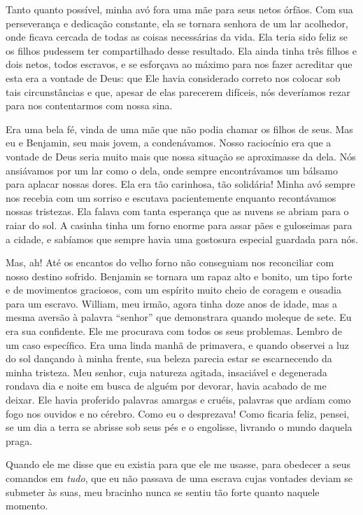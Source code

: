 Tanto quanto possível, minha avó fora
uma mãe para seus netos órfãos. Com sua perseverança e dedicação
constante, ela se tornara senhora de um lar acolhedor, onde ficava
cercada de todas as coisas necessárias da vida. Ela teria sido feliz se
os filhos pudessem ter compartilhado desse resultado. Ela ainda tinha
três filhos e dois netos, todos escravos, e se esforçava ao máximo para
nos fazer acreditar que esta era a vontade de Deus: que Ele havia
considerado correto nos colocar sob tais circunstâncias e que, apesar de
elas parecerem difíceis, nós deveríamos rezar para nos contentarmos com
nossa sina.

Era uma bela fé, vinda de uma mãe que
não podia chamar os filhos de seus. Mas eu e Benjamin, seu mais jovem, a
condenávamos. Nosso raciocínio era que a vontade de Deus seria muito
mais que nossa situação se aproximasse da dela. Nós ansiávamos por um
lar como o dela, onde sempre encontrávamos um bálsamo para aplacar
nossas dores. Ela era tão carinhosa, tão solidária! Minha avó sempre nos
recebia com um sorriso e escutava pacientemente enquanto recontávamos
nossas tristezas. Ela falava com tanta esperança que as nuvens se abriam
para o raiar do sol. A casinha tinha um forno enorme para assar pães e
guloseimas para a cidade, e sabíamos que sempre havia uma gostosura
especial guardada para nós.

Mas, ah! Até os encantos do velho forno
não conseguiam nos reconciliar com nosso destino sofrido. Benjamin se
tornara um rapaz alto e bonito, um tipo forte e de movimentos graciosos,
com um espírito muito cheio de coragem e ousadia para um escravo.
William, meu irmão, agora tinha doze anos de idade, mas a mesma aversão
à palavra ``senhor'' que demonstrara quando moleque de sete. Eu era sua
confidente. Ele me procurava com todos os seus problemas. Lembro de um
caso específico. Era uma linda manhã de primavera, e quando observei a
luz do sol dançando à minha frente, sua beleza parecia estar se
escarnecendo da minha tristeza. Meu senhor, cuja natureza agitada,
insaciável e degenerada rondava dia e noite em busca de alguém por
devorar, havia acabado de me deixar. Ele havia proferido palavras
amargas e cruéis, palavras que ardiam como fogo nos ouvidos e no
cérebro. Como eu o desprezava! Como ficaria feliz, pensei, se um dia a
terra se abrisse sob seus pés e o engolisse, livrando o mundo daquela
praga.

Quando ele me disse que eu existia para
que ele me usasse, para obedecer a seus comandos em \emph{tudo}, que eu
não passava de uma escrava cujas vontades deviam se submeter às suas,
meu bracinho nunca se sentiu tão forte quanto naquele momento.


